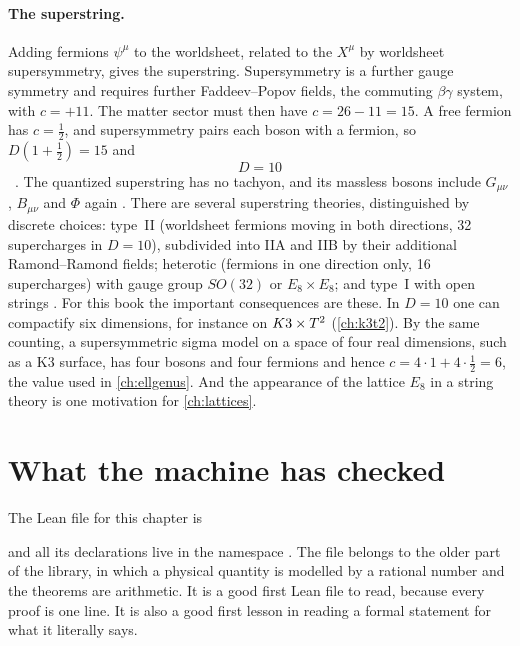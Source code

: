 \paragraph{The superstring.} Adding fermions $\psi^\mu$ to the worldsheet, related to the
$X^\mu$ by worldsheet supersymmetry, gives the superstring. Supersymmetry is a further gauge
symmetry and requires further Faddeev--Popov fields, the commuting $\beta\gamma$ system, with
$c=+11$. The matter sector must then have $c=26-11=15$. A free fermion has $c=\frac12$, and
supersymmetry pairs each boson with a fermion, so $D(1+\frac12)=15$ and
\begin{equation}\label{eq:quantum:D10}
 D=10
\end{equation}
\TL\ . The quantized superstring has no
tachyon, and its massless bosons include $G_{\mu\nu}$, $B_{\mu\nu}$ and $\Phi$ again
. There are several superstring theories, distinguished by
discrete choices: type~II (worldsheet fermions moving in both directions, 32 supercharges in
$D=10$), subdivided into IIA and IIB by their additional Ramond--Ramond fields; heterotic
(fermions in one direction only, 16 supercharges) with gauge group $SO(32)$ or $E_8\times
E_8$; and type~I with open strings . For this book the
important consequences are these. In $D=10$ one can compactify six dimensions, for instance
on $K3\times T^2$ (\cref{ch:k3t2}). By the same counting, a supersymmetric sigma model on a space of
four real dimensions, such as a K3 surface, has four bosons and four fermions and hence
$c=4\cdot1+4\cdot\frac12=6$, the value used in \cref{ch:ellgenus}. And the appearance of the lattice $E_8$ in a string
theory is one motivation for \cref{ch:lattices}.

\section{What the machine has checked}\label{sec:quantum:lean}

The Lean file for this chapter is
\begin{center}
\end{center}
and all its declarations live in the namespace
. The file belongs to the older part
of the library, in which a physical quantity is modelled by a rational number and the
theorems are arithmetic. It is a good first Lean file to read, because every proof is one
line. It is also a good first lesson in reading a formal statement for what it literally
says.

